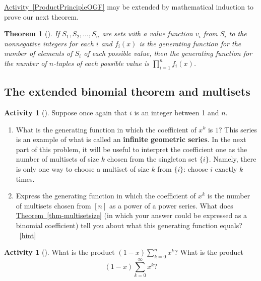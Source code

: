 \documentclass[10pt,]{book}
\newcommand{\terminology}[1]{\textbf{#1}}
\theoremstyle{plain}
\newtheorem{theorem}{Theorem}[section]
\theoremstyle{definition}
\theoremstyle{definition}
\theoremstyle{definition}
\newtheorem{activity}[project]{Activity}
\numberwithin{equation}{chapter}
\begin{document}
\hypertarget{p-1305}{}%
\hyperref[ProductPrincipleOGF]{Activity~\ref{ProductPrincipleOGF}} may be extended by mathematical induction to prove our next theorem.%
\begin{theorem}[{}]\label{theorem-14}
\hypertarget{p-1306}{}%
If \(S_1,S_2,\dots,S_n\) are sets with a value function \(v_i\) from \(S_i\) to the nonnegative integers for each \(i\) and \(f_i(x)\) is the generating function for the number of elements of \(S_i\) of each possible value, then the generating function for the number of \(n\)-tuples of each possible value is \(\prod_{i=1}^n f_i(x)\).%
\end{theorem}
\typeout{************************************************}
\typeout{************************************************}
\subsection[{The extended binomial theorem and multisets}]{The extended binomial theorem and multisets}\label{subsection-35}
\begin{activity}[]\label{activity-243}
\hypertarget{p-1307}{}%
Suppose once again that \(i\) is an integer between 1 and \(n\).%
\begin{enumerate}[font=\bfseries,label=(\alph*),ref=\alph*]
\item\label{task-244} \hypertarget{p-1308}{}%
What is the generating function in which the coefficient of \(x^k\) is \(1\)? This series is an example of what is called an \terminology{infinite geometric series}. In the next part of this problem, it will be useful to interpret the coefficient one as the number of multisets of size \(k\) chosen from the singleton set \(\{i\}\). Namely, there is only one way to choose a multiset of size \(k\) from \(\{i\}\): choose \(i\) exactly \(k\) times.%
\item\label{task-245} \hypertarget{p-1310}{}%
Express the generating function in which the coefficient of \(x^k\) is the number of multisets chosen from \([n]\) as a power of a power series.  What does \hyperref[thm-multisetsize]{Theorem~\ref{thm-multisetsize}} (in which your answer could be expressed as a binomial coefficient) tell you about what this generating function equals?%
~\hfill{\tiny\hyperlink{a-250.b}{[hint]}\hypertarget{q-250.b}{}}\end{enumerate}
\end{activity}
\begin{activity}[]\label{activity-244}
\hypertarget{p-1314}{}%
What is the product \((1-x)\sum_{k=0}^n x^k\)? What is the product%
\begin{equation*}
(1-x)\sum_{k=0}^\infty x^k?
\end{equation*}
%
\end{activity}
\end{document}
